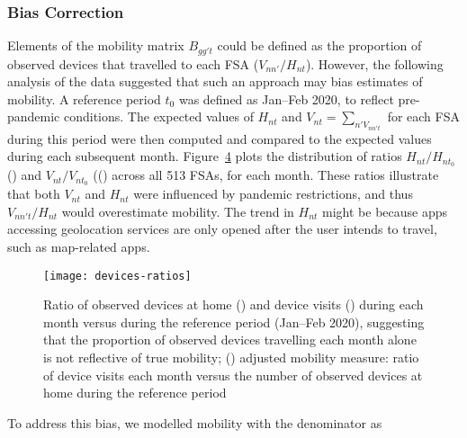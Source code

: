 \subsubsection{Bias Correction}\label{app.mob.bias}
Elements of the mobility matrix $B_{gg't}$ could be defined as
the proportion of observed devices that travelled to each FSA ($V_{nn'} / H_{nt}$).
However, the following analysis of the data suggested that such an approach may bias estimates of mobility.
A reference period $t_0$ was defined as Jan--Feb 2020, to reflect pre-pandemic conditions.
The expected values of $H_{nt}$ and $V_{nt} = \sum_{n' V_{nn't}}$ for each FSA during this period were then
computed and compared to the expected values during each subsequent month.
Figure~\ref{fig:RHVt} plots the distribution of ratios
$H_{nt} / H_{nt_0}$ () and $V_{nt} / V_{nt_0}$ (()
across all 513 FSAs, for each month.
These ratios illustrate that both $V_{nt}$ and $H_{nt}$ were influenced by pandemic restrictions,
and thus $V_{nn't} / H_{nt}$ would overestimate mobility.
The trend in $H_{nt}$ might be because apps accessing geolocation services are only opened
after the user intends to travel, such as map-related apps.
\begin{figure}[ht]
  \centering
  \begin{subfigure}{0pt}\label{fig:RHt}\end{subfigure}%
  \begin{subfigure}{0pt}\label{fig:RVt}\end{subfigure}%
  \begin{subfigure}{0pt}\label{fig:RH0Vt}\end{subfigure}%
  \texttt{[image: devices-ratios]}
  \caption{Ratio of observed devices at home () and device visits ()
    during each month versus during the reference period (Jan--Feb 2020),
    suggesting that the proportion of observed devices travelling each month
    alone is not reflective of true mobility;
    () adjusted mobility measure: ratio of device visits each month versus
    the number of observed devices at home during the reference period}
  \label{fig:RHVt}
\end{figure}
\par
To address this bias, we modelled mobility with the denominator as
